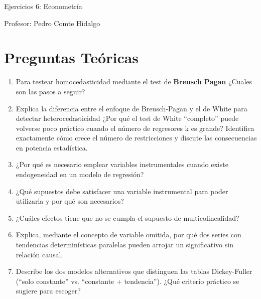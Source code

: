 \documentclass[10pt,a4paper]{article}
\begin{document}
\vspace{5cm}

\begin{center}
    {\Large  Ejercicios 6: Econometría }

Profesor:    Pedro Comte Hidalgo
\end{center}



\section{Preguntas Teóricas}
\begin{enumerate}

\item Para testear homocedasticidad mediante el test de \textbf{Breusch Pagan} ¿Cuales son las pasos a seguir?

     

 \item Explica la diferencia entre el enfoque de Breusch-Pagan y el de White para detectar heterocedasticidad ¿Por qué el test de White “completo” puede volverse poco práctico cuando el número de regresores k es grande? Identifica exactamente cómo crece el número de restricciones y discute las consecuencias en potencia estadística.
        
    

\item ¿Por qué es necesario emplear variables instrumentales cuando existe endogeneidad en un modelo de regresión?

       
\item ¿Qué supuestos debe satisfacer una variable instrumental para poder utilizarla y por qué son necesarios?


\item ¿Cuáles efectos tiene que no se cumpla el supuesto de multicolinealidad?

\item Explica, mediante el concepto de variable omitida, por qué dos series con tendencias determinísticas paralelas pueden arrojar un significativo sin relación causal.

\item Describe los dos modelos alternativos que distinguen las tablas Dickey-Fuller (“solo constante” vs. “constante + tendencia”). ¿Qué criterio práctico se sugiere para escoger?



\end{enumerate}
\end{document}
